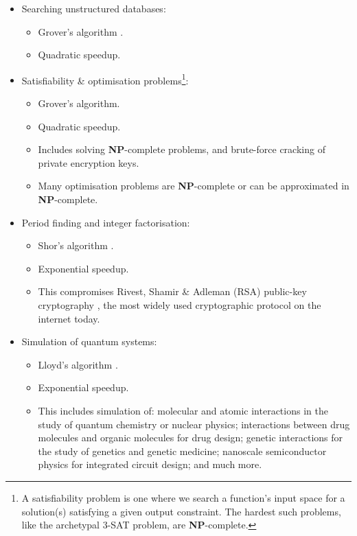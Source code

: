 \begin{itemize}
	\item Searching unstructured databases:
		\begin{itemize}
		\item Grover's algorithm \cite{bib:Grover96}.
		\item Quadratic speedup.
		\end{itemize}
	\item Satisfiability \& optimisation problems\footnote{A satisfiability problem is one where we search a function's input space for a solution(s) satisfying a given output constraint. The hardest such problems, like the archetypal 3-\textsc{SAT} problem, are \textbf{NP}-complete.}:
		\begin{itemize}
			\item Grover's algorithm.
			\item Quadratic speedup.
			\item Includes solving \textbf{NP}-complete problems, and brute-force cracking of private encryption keys.
			\item Many optimisation problems are \textbf{NP}-complete or can be approximated in \textbf{NP}-complete.
			\end{itemize}
	\item Period finding and integer factorisation:
		\begin{itemize}
		\item Shor's algorithm \cite{bib:ShorFactor}.
		\item Exponential speedup.
		\item This compromises Rivest, Shamir \& Adleman (RSA) public-key cryptography \cite{bib:RSA}, the most widely used cryptographic protocol on the internet today.
		\end{itemize}
	\item Simulation of quantum systems:
		\begin{itemize}
			\item Lloyd's algorithm \cite{bib:lloyd1996universal}.
			\item Exponential speedup.
			\item This includes simulation of: molecular and atomic interactions in the study of quantum chemistry or nuclear physics; interactions between drug molecules and organic molecules for drug design; genetic interactions for the study of genetics and genetic medicine; nanoscale semiconductor physics for integrated circuit design; and much more.

\end{itemize}
\end{itemize}
